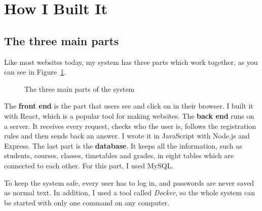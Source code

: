\documentclass[12pt,a4paper]{article}
\begin{document}
\section{How I Built It}

\subsection{The three main parts}
Like most websites today, my system has three parts which work together, as
you can see in Figure~\ref{fig:parts}.

\begin{figure}[H]
\centering
{}
\caption{The three main parts of the system}
\label{fig:parts}
\end{figure}

The \textbf{front end} is the part that users see and click on in their
browser. I built it with React, which is a popular tool for making websites.
The \textbf{back end} runs on a server. It receives every request, checks who
the user is, follows the registration rules and then sends back an answer. I
wrote it in JavaScript with Node.js and Express. The last part is the
\textbf{database}. It keeps all the information, such as students, courses,
classes, timetables and grades, in eight tables which are connected to each
other. For this part, I used MySQL.

To keep the system safe, every user has to log in, and passwords are never
saved as normal text. In addition, I used a tool called \emph{Docker}, so the
whole system can be started with only one command on any computer.
\end{document}
